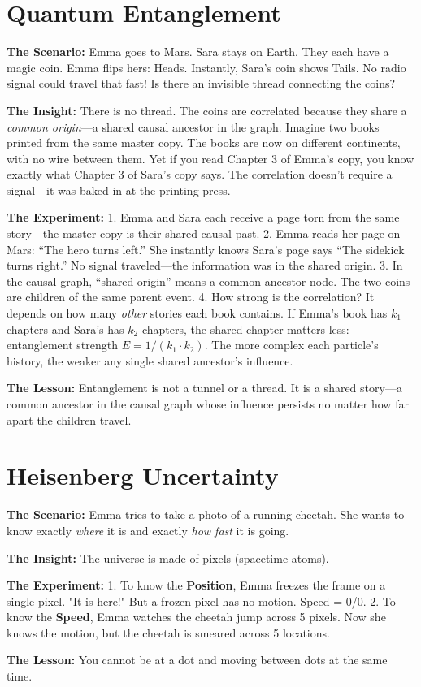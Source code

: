 \documentclass[11pt, a4paper, openany]{book}
\begin{document}
\section{Quantum Entanglement}
\begin{thoughtexp}
\textbf{The Scenario:} Emma goes to Mars. Sara stays on Earth. They each have a magic coin. Emma flips hers: Heads. Instantly, Sara's coin shows Tails. No radio signal could travel that fast! Is there an invisible thread connecting the coins?

\textbf{The Insight:} There is no thread. The coins are correlated because they share a \emph{common origin}---a shared causal ancestor in the graph. Imagine two books printed from the same master copy. The books are now on different continents, with no wire between them. Yet if you read Chapter 3 of Emma's copy, you know exactly what Chapter 3 of Sara's copy says. The correlation doesn't require a signal---it was baked in at the printing press.

\textbf{The Experiment:}
1. Emma and Sara each receive a page torn from the same story---the master copy is their shared causal past.
2. Emma reads her page on Mars: ``The hero turns left.'' She instantly knows Sara's page says ``The sidekick turns right.'' No signal traveled---the information was in the shared origin.
3. In the causal graph, ``shared origin'' means a common ancestor node. The two coins are children of the same parent event.
4. How strong is the correlation? It depends on how many \emph{other} stories each book contains. If Emma's book has $k_1$ chapters and Sara's has $k_2$ chapters, the shared chapter matters less: entanglement strength $E = 1/(k_1 \cdot k_2)$. The more complex each particle's history, the weaker any single shared ancestor's influence.

\textbf{The Lesson:} Entanglement is not a tunnel or a thread. It is a shared story---a common ancestor in the causal graph whose influence persists no matter how far apart the children travel.
\end{thoughtexp}

\section{Heisenberg Uncertainty}
\begin{thoughtexp}
\textbf{The Scenario:} Emma tries to take a photo of a running cheetah. She wants to know exactly \emph{where} it is and exactly \emph{how fast} it is going.

\textbf{The Insight:} The universe is made of pixels (spacetime atoms).

\textbf{The Experiment:}
1. To know the \textbf{Position}, Emma freezes the frame on a single pixel. "It is here!" But a frozen pixel has no motion. Speed = 0/0.
2. To know the \textbf{Speed}, Emma watches the cheetah jump across 5 pixels. Now she knows the motion, but the cheetah is smeared across 5 locations.

\textbf{The Lesson:} You cannot be at a dot and moving between dots at the same time.
\end{thoughtexp}
\end{document}
